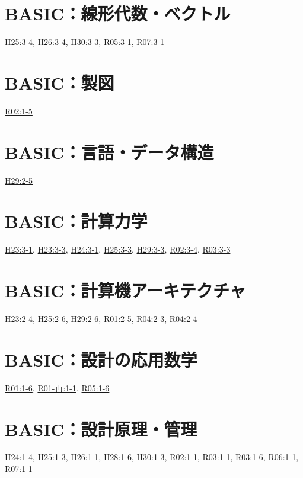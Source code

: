 \section{BASIC：線形代数・ベクトル}
\hyperref[q:h25-reg-basic-3-4]{H25:3-4}, \hyperref[q:h26-reg-basic-3-4]{H26:3-4}, \hyperref[q:h30-reg-basic-3-3]{H30:3-3}, \hyperref[q:r05-reg-basic-3-1]{R05:3-1}, \hyperref[q:r07-reg-basic-3-1]{R07:3-1}
\section{BASIC：製図}
\hyperref[q:r02-reg-basic-1-5]{R02:1-5}
\section{BASIC：言語・データ構造}
\hyperref[q:h29-reg-basic-2-5]{H29:2-5}
\section{BASIC：計算力学}
\hyperref[q:h23-reg-basic-3-1]{H23:3-1}, \hyperref[q:h23-reg-basic-3-3]{H23:3-3}, \hyperref[q:h24-reg-basic-3-1]{H24:3-1}, \hyperref[q:h25-reg-basic-3-3]{H25:3-3}, \hyperref[q:h29-reg-basic-3-3]{H29:3-3}, \hyperref[q:r02-reg-basic-3-4]{R02:3-4}, \hyperref[q:r03-reg-basic-3-3]{R03:3-3}
\section{BASIC：計算機アーキテクチャ}
\hyperref[q:h23-reg-basic-2-4]{H23:2-4}, \hyperref[q:h25-reg-basic-2-6]{H25:2-6}, \hyperref[q:h29-reg-basic-2-6]{H29:2-6}, \hyperref[q:r01-reg-basic-2-5]{R01:2-5}, \hyperref[q:r04-reg-basic-2-3]{R04:2-3}, \hyperref[q:r04-reg-basic-2-4]{R04:2-4}
\section{BASIC：設計の応用数学}
\hyperref[q:r01-reg-basic-1-6]{R01:1-6}, \hyperref[q:r01-ret-basic-1-1]{R01-再:1-1}, \hyperref[q:r05-reg-basic-1-6]{R05:1-6}
\section{BASIC：設計原理・管理}
\hyperref[q:h24-reg-basic-1-4]{H24:1-4}, \hyperref[q:h25-reg-basic-1-3]{H25:1-3}, \hyperref[q:h26-reg-basic-1-1]{H26:1-1}, \hyperref[q:h28-reg-basic-1-6]{H28:1-6}, \hyperref[q:h30-reg-basic-1-3]{H30:1-3}, \hyperref[q:r02-reg-basic-1-1]{R02:1-1}, \hyperref[q:r03-reg-basic-1-1]{R03:1-1}, \hyperref[q:r03-reg-basic-1-6]{R03:1-6}, \hyperref[q:r06-reg-basic-1-1]{R06:1-1}, \hyperref[q:r07-reg-basic-1-1]{R07:1-1}
